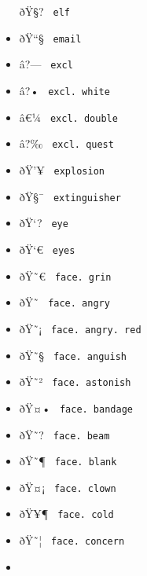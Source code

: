 \begin{itemize}
  \label{symbol-elf}{{ ðŸ§? } \texttt{\ elf\ }}
\item
  \label{symbol-email}{{ ðŸ``§ } \texttt{\ email\ }}
\item
  \label{symbol-excl}{{ â?--- } \texttt{\ excl\ }}
\item
  \label{symbol-excl.white}{{ â?• }
  \texttt{\ excl.\ white\ }}
\item
  \label{symbol-excl.double}{{ â€¼ }
  \texttt{\ excl.\ double\ }}
\item
  \label{symbol-excl.quest}{{ â?‰ }
  \texttt{\ excl.\ quest\ }}
\item
  \label{symbol-explosion}{{ ðŸ'¥ }
  \texttt{\ explosion\ }}
\item
  \label{symbol-extinguisher}{{ ðŸ§¯ }
  \texttt{\ extinguisher\ }}
\item
  \label{symbol-eye}{{ ðŸ`? } \texttt{\ eye\ }}
\item
  \label{symbol-eyes}{{ ðŸ`€ } \texttt{\ eyes\ }}
\item
  \label{symbol-face.grin}{{ ðŸ˜€ }
  \texttt{\ face.\ grin\ }}
\item
  \label{symbol-face.angry}{{ ðŸ˜ }
  \texttt{\ face.\ angry\ }}
\item
  \label{symbol-face.angry.red}{{ ðŸ˜¡ }
  \texttt{\ face.\ angry.\ red\ }}
\item
  \label{symbol-face.anguish}{{ ðŸ˜§ }
  \texttt{\ face.\ anguish\ }}
\item
  \label{symbol-face.astonish}{{ ðŸ˜² }
  \texttt{\ face.\ astonish\ }}
\item
  \label{symbol-face.bandage}{{ ðŸ¤• }
  \texttt{\ face.\ bandage\ }}
\item
  \label{symbol-face.beam}{{ ðŸ˜? }
  \texttt{\ face.\ beam\ }}
\item
  \label{symbol-face.blank}{{ ðŸ˜¶ }
  \texttt{\ face.\ blank\ }}
\item
  \label{symbol-face.clown}{{ ðŸ¤¡ }
  \texttt{\ face.\ clown\ }}
\item
  \label{symbol-face.cold}{{ ðŸ¥¶ }
  \texttt{\ face.\ cold\ }}
\item
  \label{symbol-face.concern}{{ ðŸ˜¦ }
  \texttt{\ face.\ concern\ }}
\item

\end{itemize}
